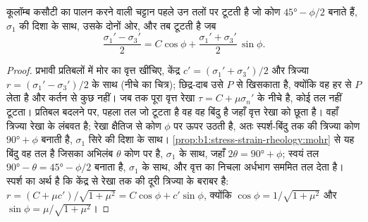 \begin{theorem}[विफलता का कोण]
\label{thm:b1:stress-strain-rheology:failure-angle}
कूलॉम्ब कसौटी का पालन करने वाली चट्टान पहले उन तलों पर टूटती है जो कोण $\ang{45} - \phi/2$ बनाते हैं, $\sigma_1$ की दिशा के साथ, उसके दोनों ओर, और तब टूटती है जब
\[
  \frac{\sigma_1' - \sigma_3'}{2} = C\cos\phi + \frac{\sigma_1' + \sigma_3'}{2}\,\sin\phi .
\]
\end{theorem}

\begin{proof}
प्रभावी प्रतिबलों में मोर का वृत्त खींचिए, केंद्र $c' =
(\sigma_1'+\sigma_3')/2$ और त्रिज्या $r = (\sigma_1'-\sigma_3')/2$ के साथ (नीचे का चित्र); छिद्र-दाब उसे $P$ से खिसकाता है, क्योंकि वह हर  से $P$ लेता है और कर्तन से कुछ नहीं। जब तक पूरा वृत्त रेखा $\tau = C + \mu\sigma_n'$ के नीचे है, कोई तल नहीं टूटता। प्रतिबल बदलने पर, पहला तल जो टूटता है वह वह बिंदु है जहाँ वृत्त रेखा को छूता है। वहाँ त्रिज्या रेखा के लंबवत है; रेखा क्षैतिज से कोण $\phi$ पर ऊपर उठती है, अतः स्पर्श-बिंदु तक की त्रिज्या कोण $\ang{90} + \phi$ बनाती है, $\sigma_1$ सिरे की दिशा के साथ। \cref{prop:b1:stress-strain-rheology:mohr} से यह बिंदु वह तल है जिसका अभिलंब $\theta$ कोण पर है, $\sigma_1$ के साथ, जहाँ $2\theta = \ang{90} + \phi$; स्वयं तल $\ang{90} - \theta = \ang{45} - \phi/2$ बनाता है, $\sigma_1$ के साथ, और वृत्त का निचला अर्धभाग सममित तल देता है। स्पर्श का अर्थ है कि केंद्र से रेखा तक की दूरी त्रिज्या के बराबर है: $r = (C + \mu c')/\sqrt{1+\mu^2} = C\cos\phi + c'\sin\phi$, क्योंकि $\cos\phi = 1/\sqrt{1+\mu^2}$ और $\sin\phi = \mu/\sqrt{1+\mu^2}$।
\end{proof}

